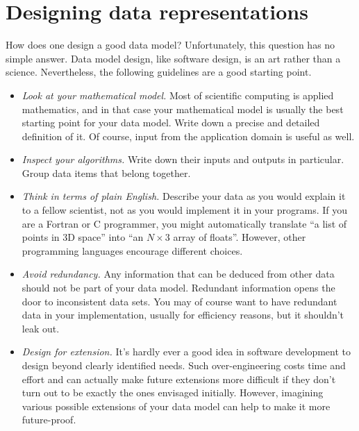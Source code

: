 \documentclass{csmagazine}
\begin{document}
\section*{Designing data representations}

How does one design a good data model? Unfortunately, this question has no simple answer. Data model design, like software design, is an art rather than a science. Nevertheless, the following guidelines are a good starting point.

\begin{itemize}
\item \textit{Look at your mathematical model.} Most of scientific computing is applied mathematics, and in that case your mathematical model is usually the best starting point for your data model. Write down a precise and detailed definition of it. Of course, input from the application domain is useful as well.

\item \textit{Inspect your algorithms.} Write down their inputs and outputs in particular. Group data items that belong together.

\item \textit{Think in terms of plain English.} Describe your data as you would explain it to a fellow scientist, not as you would implement it in your programs. If you are a Fortran or C programmer, you might automatically translate ``a list of points in 3D space'' into ``an $N\times 3$ array of floats''. However, other programming languages encourage different choices.

\item \textit{Avoid redundancy.} Any information that can be deduced from other data should not be part of your data model. Redundant information opens the door to inconsistent data sets. You may of course want to have redundant data in your implementation, usually for efficiency reasons, but it shouldn't leak out.

\item \textit{Design for extension.} It's hardly ever a good idea in software development to design beyond clearly identified needs. Such over-engineering costs time and effort and can actually make future extensions more difficult if they don't turn out to be exactly the ones envisaged initially. However, imagining various possible extensions of your data model can help to make it more future-proof.

\end{itemize}
\end{document}
